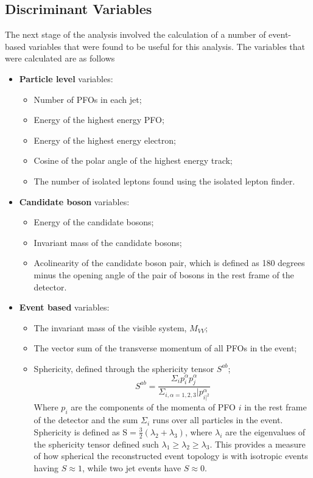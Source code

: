 \subsection{Discriminant Variables} 
\label{sec:analysisprocessor}
The next stage of the analysis involved the calculation of a number of event-based variables that were found to be useful for this analysis.  The variables that were calculated are as follows
%
\begin{itemize}
\item \textbf{Particle level} variables:

\begin{itemize}
\item Number of PFOs in each jet;
\item Energy of the highest energy PFO;
\item Energy of the highest energy electron;
\item Cosine of the polar angle of the highest energy track;
\item The number of isolated leptons found using the isolated lepton finder.
\end{itemize}

\item \textbf{Candidate boson} variables:
\begin{itemize}
\item Energy of the candidate bosons;
\item Invariant mass of the candidate bosons;
\item Acolinearity of the candidate boson pair, which is defined as 180 degrees minus the opening angle of the pair of bosons in the rest frame of the detector.
\end{itemize}

\item \textbf{Event based} variables:  
\begin{itemize}
\item The invariant mass of the visible system, $M_{VV}$;
\item The vector sum of the transverse momentum of all PFOs in the event;
\item Sphericity, defined through the sphericity tensor $S^{ab}$;
\begin{equation}
S^{ab} = \frac{\Sigma_{i}p^{\alpha}_{i}p^{\alpha}_{j}}{\Sigma_{i,\alpha=1,2,3}|p^{\alpha}_{i|^{2}}}
\end{equation}
Where $p_{i}$ are the components of the momenta of PFO $i$ in the rest frame of the detector and the sum $\Sigma_{i}$ runs over all particles in the event.  Sphericity is defined as $\text{S} = \frac{3}{2}(\lambda_{2} + \lambda_{3})$, where $\lambda_{i}$ are the eigenvalues of the sphericity tensor defined such $\lambda_{1} \geq \lambda_{2} \geq \lambda_{3}$.  This provides a measure of how spherical the reconstructed event topology is with isotropic events having $S \approx 1$, while two jet events have $S \approx 0$.
\end{itemize}


\end{itemize}
